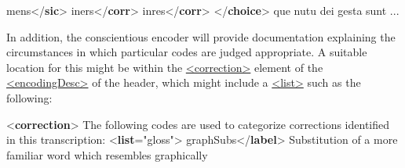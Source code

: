 \begin{shaded}
mens{</\textbf{sic}>}\mbox{}\newline 
{}iners{</\textbf{corr}>}\mbox{}\newline 
{}inres{</\textbf{corr}>}\mbox{}\newline 
{</\textbf{choice}>} que\mbox{}\newline 
 nutu dei gesta sunt ...\end{shaded}\egroup\par \noindent  In addition, the conscientious encoder will provide documentation explaining the circumstances in which particular codes are judged appropriate. A suitable location for this might be within the \hyperref[TEI.correction]{<correction>} element of the \hyperref[TEI.encodingDesc]{<encodingDesc>} of the header, which might include a \hyperref[TEI.list]{<list>} such as the following: \par\bgroup{}\exampleFont \begin{shaded}\noindent\mbox{}{<\textbf{correction}>}\mbox{}\newline 
{}The following codes are used to categorize corrections identified in this\mbox{}\newline 
\hspace*{1em}\hspace*{1em} transcription: {<\textbf{list}\hspace*{1em}{type}="{gloss}">}\mbox{}\newline 
\hspace*{1em}\hspace*{1em}graphSubs{</\textbf{label}>}\mbox{}\newline 
\hspace*{1em}\hspace*{1em}Substitution of a more familiar word which resembles graphically\mbox{}\newline 

\end{shaded}
